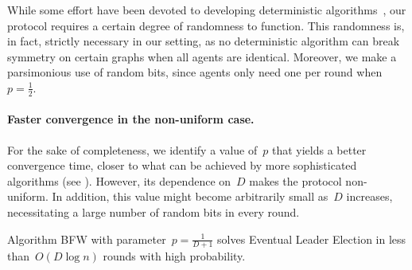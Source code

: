 \documentclass{article}
\newcommand{\rnote}[1]{{\color{myred} ({\bf Robin:} #1)}}
\newcommand{\inote}[1]{{\color{blue} ({\bf Isa:} #1)}}
\newcommand{\protocolname}{BFW\xspace}
\begin{document}
While some effort have been devoted to developing deterministic algorithms~\cite{ForsterSW14,DufoulonBB18}, our protocol requires a certain degree of randomness to function. This randomness is, in fact, strictly necessary in our setting, as no deterministic algorithm can break symmetry on certain graphs when all agents are identical.
Moreover, we make a parsimonious use of random bits, since agents only need one per round when~$p=\frac{1}{2}$.



\paragraph{Faster convergence in the non-uniform case.} For the sake of completeness, we identify a value of~$p$ that yields a better convergence time, closer to what can be achieved by more sophisticated algorithms (see ). However, its dependence on~$D$ makes the protocol non-uniform. In addition, this value might become arbitrarily small as~$D$ increases, necessitating a large number of random bits in every round.



\begin{theorem} \label{thm:side}
    Algorithm \protocolname with parameter~$p = \frac{1}{D+1}$ solves Eventual Leader Election in less than~$O(D \log n)$ rounds with high probability.
\end{theorem}
\end{document}
